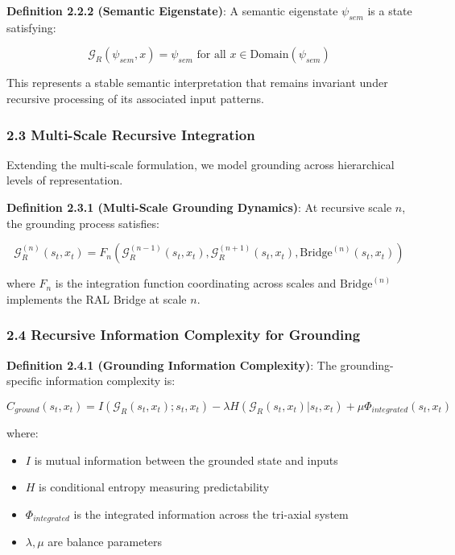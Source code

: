 \documentclass[
]{article}
\providecommand{\tightlist}{%
  \setlength{\itemsep}{0pt}\setlength{\parskip}{0pt}}
\begin{document}
\textbf{Definition 2.2.2 (Semantic Eigenstate)}: A semantic eigenstate
\(\psi_{sem}\) is a state satisfying:

\[\mathcal{G}_R(\psi_{sem}, x) = \psi_{sem} \text{ for all } x \in \text{Domain}(\psi_{sem})\]

This represents a stable semantic interpretation that remains invariant
under recursive processing of its associated input patterns.

\subsubsection{2.3 Multi-Scale Recursive
Integration}\label{multi-scale-recursive-integration}

Extending the multi-scale formulation, we model grounding across
hierarchical levels of representation.

\textbf{Definition 2.3.1 (Multi-Scale Grounding Dynamics)}: At recursive
scale \(n\), the grounding process satisfies:

\[\mathcal{G}_R^{(n)}(s_t, x_t) = F_n(\mathcal{G}_R^{(n-1)}(s_t, x_t), \mathcal{G}_R^{(n+1)}(s_t, x_t), \text{Bridge}^{(n)}(s_t, x_t))\]

where \(F_n\) is the integration function coordinating across scales and
\(\text{Bridge}^{(n)}\) implements the RAL Bridge at scale \(n\).

\subsubsection{2.4 Recursive Information Complexity for
Grounding}\label{recursive-information-complexity-for-grounding}

\textbf{Definition 2.4.1 (Grounding Information Complexity)}: The
grounding-specific information complexity is:

\[C_{ground}(s_t, x_t) = I(\mathcal{G}_R(s_t, x_t); s_t, x_t) - \lambda H(\mathcal{G}_R(s_t, x_t) | s_t, x_t) + \mu \Phi_{integrated}(s_t, x_t)\]

where:

\begin{itemize}
\tightlist
\item
  \(I\) is mutual information between the grounded state and inputs
\item
  \(H\) is conditional entropy measuring predictability
\item
  \(\Phi_{integrated}\) is the integrated information across the
  tri-axial system
\item
  \(\lambda, \mu\) are balance parameters
\end{itemize}
\end{document}
